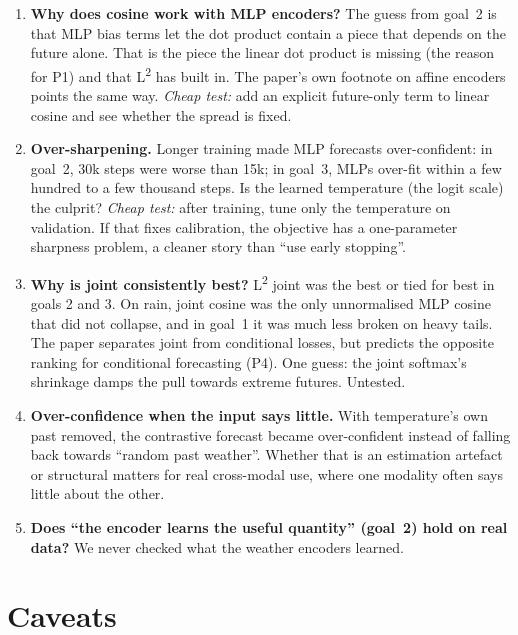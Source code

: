 \documentclass[11pt]{article}
\newcommand{\Ltwo}{L\textsuperscript{2}}
\begin{document}
\begin{enumerate}
\item \textbf{Why does cosine work with MLP encoders?} The guess from goal~2 is that MLP
  bias terms let the dot product contain a piece that depends on the future alone. That is
  the piece the linear dot product is missing (the reason for P1) and that \Ltwo{} has
  built in. The paper's own footnote on affine encoders points the same way.
  \emph{Cheap test:} add an explicit future-only term to linear cosine and see whether the
  spread is fixed.
\item \textbf{Over-sharpening.} Longer training made MLP forecasts over-confident: in
  goal~2, 30k steps were worse than 15k; in goal~3, MLPs over-fit within a few hundred to a
  few thousand steps. Is the learned temperature (the logit scale) the culprit?
  \emph{Cheap test:} after training, tune only the temperature on validation. If that fixes
  calibration, the objective has a one-parameter sharpness problem, a cleaner story than
  ``use early stopping''.
\item \textbf{Why is joint consistently best?} \Ltwo{} joint was the best or tied for best
  in goals 2 and 3. On rain, joint cosine was the only unnormalised MLP cosine that did not
  collapse, and in goal~1 it was much less broken on heavy tails. The paper separates joint
  from conditional losses, but predicts the opposite ranking for conditional forecasting
  (P4). One guess: the joint softmax's shrinkage damps the pull towards extreme futures.
  Untested.
\item \textbf{Over-confidence when the input says little.} With temperature's own past
  removed, the contrastive forecast became over-confident instead of falling back towards
  ``random past weather''. Whether that is an estimation artefact or structural matters for
  real cross-modal use, where one modality often says little about the other.
\item \textbf{Does ``the encoder learns the useful quantity'' (goal~2) hold on real data?}
  We never checked what the weather encoders learned.
\end{enumerate}

\section{Caveats}
\end{document}
